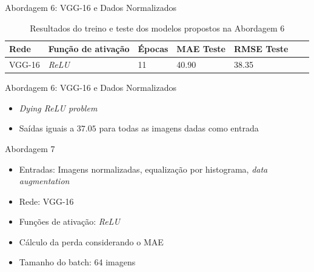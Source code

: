 \begin{frame}{\large{Abordagem 6: VGG-16 e Dados Normalizados}}
  \begin{table}[!ht]
    \centering
    \caption{Resultados do treino e teste dos modelos propostos na Abordagem 6}
    \label{tab:results-6}
    \begin{tabular}{l l l l l l l}
      \toprule
      Rede & Função de ativação & Épocas & MAE Teste & RMSE Teste \\
      \midrule
      VGG-16 & \emph{ReLU} & 11 & 40.90 & 38.35 \\
      \bottomrule
    \end{tabular}
  \end{table}
\end{frame}

\begin{frame}{\large{Abordagem 6: VGG-16 e Dados Normalizados}}
  \begin{itemize}
    \item \emph{Dying ReLU problem}
    \item Saídas iguais a $37.05$ para todas as imagens dadas como entrada
  \end{itemize}
\end{frame}




\begin{frame}{\large{Abordagem 7}}
 \begin{itemize}
   \item Entradas: Imagens normalizadas, \alert{equalização por histograma, \emph{data augmentation}}
   \item Rede: VGG-16
   \item Funções de ativação: \emph{ReLU}
   \ \ \newline
   \item Cálculo da perda considerando o MAE
   \item Tamanho do batch: 64 imagens
   \end{itemize}
\end{frame}

